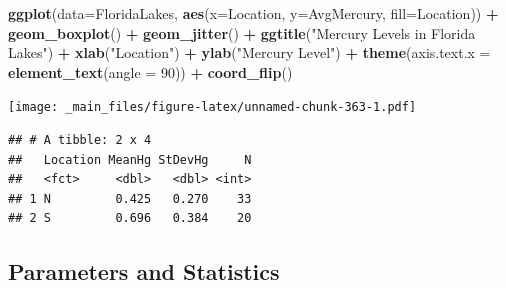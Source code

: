 \documentclass[]{book}
\newenvironment{Shaded}{\begin{snugshade}}{\end{snugshade}}
\newcommand{\KeywordTok}[1]{\textcolor[rgb]{0.13,0.29,0.53}{\textbf{#1}}}
\newcommand{\DataTypeTok}[1]{\textcolor[rgb]{0.13,0.29,0.53}{#1}}
\newcommand{\DecValTok}[1]{\textcolor[rgb]{0.00,0.00,0.81}{#1}}
\newcommand{\StringTok}[1]{\textcolor[rgb]{0.31,0.60,0.02}{#1}}
\newcommand{\OperatorTok}[1]{\textcolor[rgb]{0.81,0.36,0.00}{\textbf{#1}}}
\newcommand{\NormalTok}[1]{#1}
\begin{document}
\begin{Shaded}
\begin{Highlighting}[]
\KeywordTok{ggplot}\NormalTok{(}\DataTypeTok{data=}\NormalTok{FloridaLakes,  }\KeywordTok{aes}\NormalTok{(}\DataTypeTok{x=}\NormalTok{Location, }\DataTypeTok{y=}\NormalTok{AvgMercury, }\DataTypeTok{fill=}\NormalTok{Location)) }\OperatorTok{+}\StringTok{ }
\StringTok{  }\KeywordTok{geom_boxplot}\NormalTok{() }\OperatorTok{+}\StringTok{   }\KeywordTok{geom_jitter}\NormalTok{() }\OperatorTok{+}\StringTok{  }\KeywordTok{ggtitle}\NormalTok{(}\StringTok{"Mercury Levels in Florida Lakes"}\NormalTok{) }\OperatorTok{+}\StringTok{ }
\StringTok{  }\KeywordTok{xlab}\NormalTok{(}\StringTok{"Location"}\NormalTok{) }\OperatorTok{+}\StringTok{ }\KeywordTok{ylab}\NormalTok{(}\StringTok{"Mercury Level"}\NormalTok{) }\OperatorTok{+}\StringTok{  }\KeywordTok{theme}\NormalTok{(}\DataTypeTok{axis.text.x =} \KeywordTok{element_text}\NormalTok{(}\DataTypeTok{angle =} \DecValTok{90}\NormalTok{)) }\OperatorTok{+}\StringTok{ }\KeywordTok{coord_flip}\NormalTok{()}
\end{Highlighting}
\end{Shaded}

\texttt{[image: \_main\_files/figure-latex/unnamed-chunk-363-1.pdf]}

\begin{Shaded}
\end{Shaded}

\begin{verbatim}
## # A tibble: 2 x 4
##   Location MeanHg StDevHg     N
##   <fct>     <dbl>   <dbl> <int>
## 1 N         0.425   0.270    33
## 2 S         0.696   0.384    20
\end{verbatim}

\subsection{Parameters and Statistics}\label{parameters-and-statistics}
\end{document}
